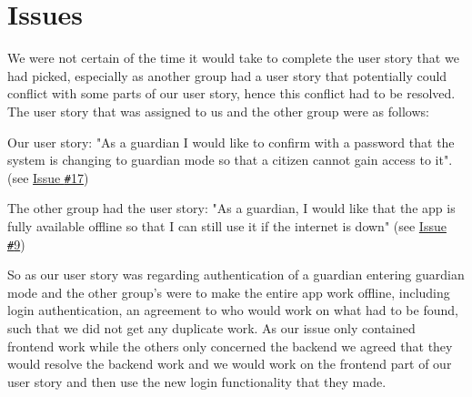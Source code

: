 \section{Issues}
We were not certain of the time it would take to complete the user story that we had picked, especially as another group had a user story that potentially could conflict with some parts of our user story, hence this conflict had to be resolved.
The user story that was assigned to us and the other group were as follows:

Our user story: "As a guardian I would like to confirm with a password that the system is changing to guardian mode so that a citizen cannot gain access to it". (see  \href{https://github.com/aau-giraf/weekplanner/issues/17}{Issue \texttt{\#}17})

The other group had the user story: "As a guardian, I would like that the app is fully available offline so that I can still use it if the internet is down" (see  \href{https://github.com/aau-giraf/weekplanner/issues/9}{Issue \texttt{\#}9}) 

So as our user story was regarding authentication of a guardian entering guardian mode and the other group's were to make the entire app work offline, including login authentication, an agreement to who would work on what had to be found, such that we did not get any duplicate work.
As our issue only contained frontend work while the others only concerned the backend we agreed that they would resolve the backend work and we would work on the frontend part of our user story and then use the new login functionality that they made.
